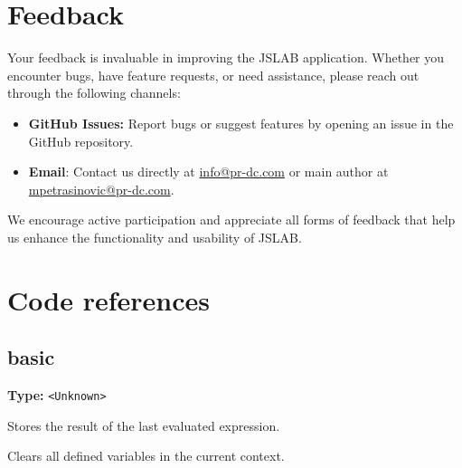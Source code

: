 \documentclass[12pt,a4paper]{article}
\begin{document}
\section{Feedback}

Your feedback is invaluable in improving the JSLAB application. Whether you encounter bugs, have feature requests, or need assistance, please reach out through the following channels:

\begin{itemize}
    \item \textbf{GitHub Issues:} Report bugs or suggest features by opening an issue in the GitHub repository.
    
    \item \textbf{Email}: Contact us directly at \href{mailto:info@pr-dc.com}{info@pr-dc.com} or main author at \href{mailto:mpetrasinovic@pr-dc.com}{mpetrasinovic@pr-dc.com}.
\end{itemize}

We encourage active participation and appreciate all forms of feedback that help us enhance the functionality and usability of JSLAB.

\section{Code references}

\subsection{basic}
\vspace{5mm}
\noindent {}\vspace{4mm}


\noindent \textbf{Type:} \texttt{<Unknown>}

\noindent Stores the result of the last evaluated expression.

\vspace{5mm}
\noindent {}


\noindent Clears all defined variables in the current context.

\vspace{5mm}
\noindent {}
\end{document}
